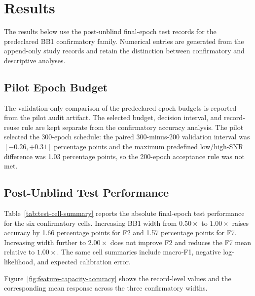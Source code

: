 \section{Results}
\label{sec:results}
The results below use the post-unblind final-epoch test records for the
predeclared BB1 confirmatory family. Numerical entries are generated from the
append-only study records and retain the distinction between confirmatory and
descriptive analyses.

\subsection{Pilot Epoch Budget}
The validation-only comparison of the predeclared epoch budgets is reported
from the pilot audit artifact. The selected budget, decision interval, and
record-reuse rule are kept separate from the confirmatory accuracy analysis.
The pilot selected the 300-epoch schedule: the paired 300-minus-200
validation interval was $[-0.26,+0.31]$ percentage points and the maximum
predefined low/high-SNR difference was 1.03 percentage points, so the
200-epoch acceptance rule was not met.

\subsection{Post-Unblind Test Performance}
Table~\ref{tab:test-cell-summary} reports the absolute final-epoch test
performance for the six confirmatory cells. Increasing BB1 width from
$0.50\times$ to $1.00\times$ raises accuracy by 1.66 percentage points for
F2 and 1.57 percentage points for F7. Increasing width further to
$2.00\times$ does not improve F2 and reduces the F7 mean relative to
$1.00\times$. The same cell summaries include macro-F1, negative
log-likelihood, and expected calibration error.

Figure~\ref{fig:feature-capacity-accuracy} shows the record-level values and
the corresponding mean response across the three confirmatory widths.


